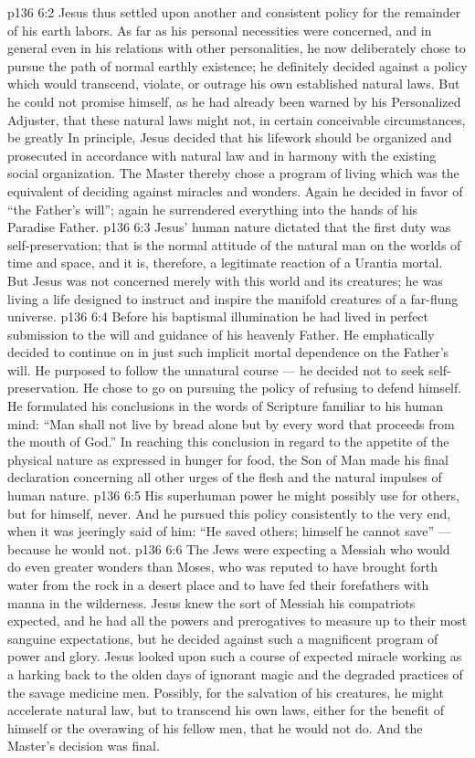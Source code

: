 \vs p136 6:2 Jesus thus settled upon another and consistent policy for the remainder of his earth labors. As far as his personal necessities were concerned, and in general even in his relations with other personalities, he now deliberately chose to pursue the path of normal earthly existence; he definitely decided against a policy which would transcend, violate, or outrage his own established natural laws. But he could not promise himself, as he had already been warned by his Personalized Adjuster, that these natural laws might not, in certain conceivable circumstances, be greatly  In principle, Jesus decided that his lifework should be organized and prosecuted in accordance with natural law and in harmony with the existing social organization. The Master thereby chose a program of living which was the equivalent of deciding against miracles and wonders. Again he decided in favor of “the Father’s will”; again he surrendered everything into the hands of his Paradise Father.
\vs p136 6:3 Jesus’ human nature dictated that the first duty was self\hyp{}preservation; that is the normal attitude of the natural man on the worlds of time and space, and it is, therefore, a legitimate reaction of a Urantia mortal. But Jesus was not concerned merely with this world and its creatures; he was living a life designed to instruct and inspire the manifold creatures of a far\hyp{}flung universe.
\vs p136 6:4 Before his baptismal illumination he had lived in perfect submission to the will and guidance of his heavenly Father. He emphatically decided to continue on in just such implicit mortal dependence on the Father’s will. He purposed to follow the unnatural course --- he decided not to seek self\hyp{}preservation. He chose to go on pursuing the policy of refusing to defend himself. He formulated his conclusions in the words of Scripture familiar to his human mind: “Man shall not live by bread alone but by every word that proceeds from the mouth of God.” In reaching this conclusion in regard to the appetite of the physical nature as expressed in hunger for food, the Son of Man made his final declaration concerning all other urges of the flesh and the natural impulses of human nature.
\vs p136 6:5 His superhuman power he might possibly use for others, but for himself, never. And he pursued this policy consistently to the very end, when it was jeeringly said of him: “He saved others; himself he cannot save” --- because he would not.
\vs p136 6:6 The Jews were expecting a Messiah who would do even greater wonders than Moses, who was reputed to have brought forth water from the rock in a desert place and to have fed their forefathers with manna in the wilderness. Jesus knew the sort of Messiah his compatriots expected, and he had all the powers and prerogatives to measure up to their most sanguine expectations, but he decided against such a magnificent program of power and glory. Jesus looked upon such a course of expected miracle working as a harking back to the olden days of ignorant magic and the degraded practices of the savage medicine men. Possibly, for the salvation of his creatures, he might accelerate natural law, but to transcend his own laws, either for the benefit of himself or the overawing of his fellow men, that he would not do. And the Master’s decision was final.
